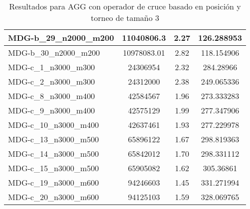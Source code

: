 \documentclass[10pt,a4paper]{article}
\begin{document}
\begin{table}[H]
\begin{center}
\begin{tabular}{|l|c|c|c|}
					MDG-b\_29\_n2000\_m200 & 11040806.3 & 2.27 & 126.288953 \\ \hline
					MDG-b\_30\_n2000\_m200 & 10978083.01 & 2.82 & 118.154906 \\ \hline
					MDG-c\_1\_n3000\_m300 & 24306954 & 2.32 & 284.28966 \\ \hline
					MDG-c\_2\_n3000\_m300 & 24312000 & 2.38 & 249.065336 \\ \hline
					MDG-c\_8\_n3000\_m400 & 42584567 & 1.96 & 273.333283 \\ \hline
					MDG-c\_9\_n3000\_m400 & 42575129 & 1.99 & 277.347906 \\ \hline
					MDG-c\_10\_n3000\_m400 & 42637461 & 1.93 & 277.229978 \\ \hline
					MDG-c\_13\_n3000\_m500 & 65896122 & 1.67 & 298.819363 \\ \hline
					MDG-c\_14\_n3000\_m500 & 65842012 & 1.70 & 298.331112 \\ \hline
					MDG-c\_15\_n3000\_m500 & 65905082 & 1.62 & 305.36861 \\ \hline
					MDG-c\_19\_n3000\_m600 & 94246603 & 1.45 & 331.271994 \\ \hline
					MDG-c\_20\_n3000\_m600 & 94125103 & 1.59 & 328.069765 \\ \hline
				\end{tabular}
				\caption{Resultados para AGG con operador de cruce basado en posición y  torneo de tamaño 3}
				\label{}
				\end{center}
			\end{table}
			
\end{document}
